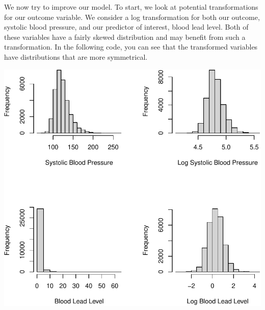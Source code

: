 \documentclass[
  letterpaper,
]{latex/krantz}
\makeatletter
\newenvironment{Shaded}{\begin{snugshade}}{\end{snugshade}}
\newcommand{\AttributeTok}[1]{\textcolor[rgb]{0.40,0.45,0.13}{#1}}
\newcommand{\DecValTok}[1]{\textcolor[rgb]{0.68,0.00,0.00}{#1}}
\newcommand{\FunctionTok}[1]{\textcolor[rgb]{0.28,0.35,0.67}{#1}}
\newcommand{\NormalTok}[1]{\textcolor[rgb]{0.00,0.23,0.31}{#1}}
\newcommand{\SpecialCharTok}[1]{\textcolor[rgb]{0.37,0.37,0.37}{#1}}
\newcommand{\StringTok}[1]{\textcolor[rgb]{0.13,0.47,0.30}{#1}}
\newenvironment{kframe}{%
\medskip{}
\setlength{\fboxsep}{.8em}
 \def\at@end@of@kframe{}%
 \ifinner\ifhmode%
  \def\at@end@of@kframe{\end{minipage}}%
  \begin{minipage}{\columnwidth}%
 \fi\fi%
 \def\FrameCommand##1{\hskip\@totalleftmargin \hskip-\fboxsep
 \colorbox{shadecolor}{##1}\hskip-\fboxsep
     \hskip-\linewidth \hskip-\@totalleftmargin \hskip\columnwidth}%
 \MakeFramed {\advance\hsize-\width
   \@totalleftmargin\z@ \linewidth\hsize
   \@setminipage}}%
 {\par\unskip\endMakeFramed%
 \at@end@of@kframe}
\renewenvironment{Shaded}{\begin{kframe}}{\end{kframe}}
\makeatother
\begin{document}
We now try to improve our model. To start, we look at potential
transformations for our outcome variable. We consider a log
transformation for both our outcome, systolic blood pressure, and our
predictor of interest, blood lead level. Both of these variables have a
fairly skewed distribution and may benefit from such a transformation.
In the following code, you can see that the transformed variables have
distributions that are more symmetrical.

\begin{Shaded}
\end{Shaded}

\begin{center}
\includegraphics[width=1\textwidth,height=\textheight]{book/linear_regression_files/figure-pdf/unnamed-chunk-24-1.pdf}
\end{center}
\end{document}
